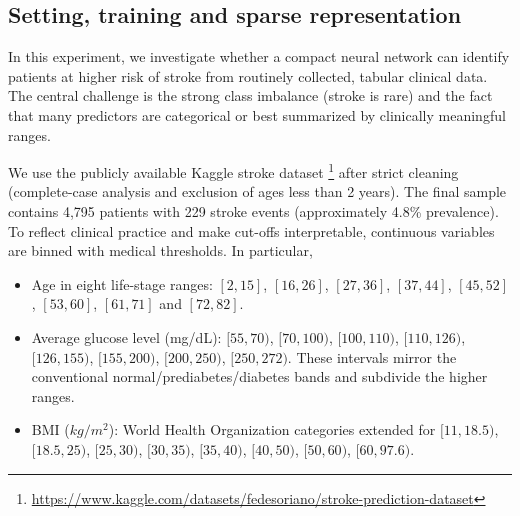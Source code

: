 \documentclass[letterpaper,11pt]{article}
\numberwithin{equation}{section}
\numberwithin{equation}{section}
\begin{document}

\subsection{Setting, training and sparse representation}

In this experiment, we investigate whether a compact neural network can identify patients at higher risk of stroke from routinely collected, tabular clinical data. The central challenge is the strong class imbalance (stroke is rare) and the fact that many predictors are categorical or best summarized by clinically meaningful ranges.

We use the publicly available Kaggle stroke dataset \footnote{\url{https://www.kaggle.com/datasets/fedesoriano/stroke-prediction-dataset}} after strict cleaning (complete-case analysis and exclusion of ages less than 2 years). The final sample contains 4,795 patients with 229 stroke events (approximately 4.8\% prevalence). To reflect clinical practice and make cut-offs interpretable, continuous variables are binned with medical thresholds. In particular, 
\begin{itemize}
    \item Age in eight life-stage ranges: $[2,15]$, $[16,26]$, $[27,36]$, $[37,44]$, $[45,52]$, $[53,60]$, $[61,71]$ and $[72,82]$.
    \item Average glucose level (mg/dL): $[55,70)$, $[70,100)$, $[100,110)$, $[110,126)$, $[126,155)$, $[155,200)$, $[200,250)$, $[250,272)$. These intervals mirror the conventional normal/prediabetes/diabetes bands and subdivide the higher ranges.
    \item BMI ($kg/m^2$): World Health Organization categories extended for $[11,18.5)$, $[18.5,25)$, $[25,30)$, $[30,35)$, $[35,40)$, $[40,50)$, $[50,60)$, $[60,97.6)$.
\end{itemize}
\end{document}
